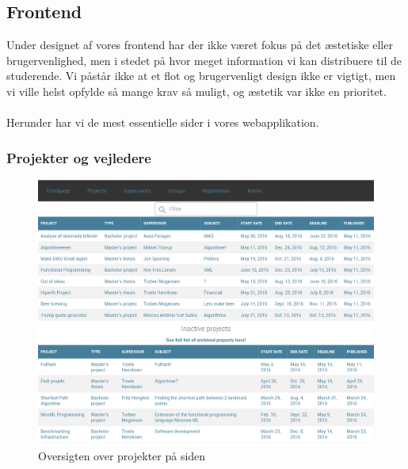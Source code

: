 \documentclass[12pt]{article}
\begin{document}
\subsection{Frontend}
Under designet af vores frontend har der ikke været fokus på det æstetiske eller brugervenlighed, men i stedet på hvor meget information vi kan distribuere til de studerende. Vi påstår ikke at et flot og brugervenligt design ikke er vigtigt, men vi ville helst opfylde så mange krav så muligt, og æstetik var ikke en prioritet.\\
\\
Herunder har vi de mest essentielle sider i vores webapplikation.

\subsubsection{Projekter og vejledere}
\begin{figure}[H]
    \centering
    \includegraphics[scale=0.33]{frontend_projects.png}
    \caption{Oversigten over projekter på siden}
    \label{fig:frontend_projects}
\end{figure}
\end{document}
